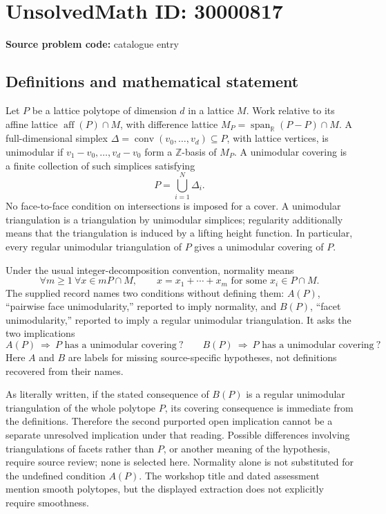 \documentclass[11pt]{article}
\newcommand{\Z}{\mathbb{Z}}
\newcommand{\R}{\mathbb{R}}
\begin{document}
\section*{UnsolvedMath ID: 30000817}
\textbf{Source problem code:} catalogue entry
\subsection{Definitions and mathematical statement}
Let \(P\) be a lattice polytope of dimension \(d\) in a lattice \(M\). Work relative to its affine lattice \(\operatorname{aff}(P)\cap M\), with difference lattice \(M_P=\operatorname{span}_{\R}(P-P)\cap M\). A full-dimensional simplex \(\Delta=\operatorname{conv}(v_0,\ldots,v_d)\subseteq P\), with lattice vertices, is unimodular if \(v_1-v_0,\ldots,v_d-v_0\) form a \(\Z\)-basis of \(M_P\). A unimodular covering is a finite collection of such simplices satisfying
\[
 P=\bigcup_{i=1}^N\Delta_i.
\]
No face-to-face condition on intersections is imposed for a cover. A unimodular triangulation is a triangulation by unimodular simplices; regularity additionally means that the triangulation is induced by a lifting height function. In particular, every regular unimodular triangulation of \(P\) gives a unimodular covering of \(P\).

Under the usual integer-decomposition convention, normality means
\[
 \forall m\geq1\ \forall x\in mP\cap M,\qquad
 x=x_1+\cdots+x_m\text{ for some }x_i\in P\cap M.
\]
The supplied record names two conditions without defining them: \(A(P)\), ``pairwise face unimodularity,'' reported to imply normality, and \(B(P)\), ``facet unimodularity,'' reported to imply a regular unimodular triangulation. It asks the two implications
\[
 A(P)\ \Longrightarrow\ P\text{ has a unimodular covering}\ ?
 \qquad
 B(P)\ \Longrightarrow\ P\text{ has a unimodular covering}\ ?
\]
Here \(A\) and \(B\) are labels for missing source-specific hypotheses, not definitions recovered from their names.

As literally written, if the stated consequence of \(B(P)\) is a regular unimodular triangulation of the whole polytope \(P\), its covering consequence is immediate from the definitions. Therefore the second purported open implication cannot be a separate unresolved implication under that reading. Possible differences involving triangulations of facets rather than \(P\), or another meaning of the hypothesis, require source review; none is selected here. Normality alone is not substituted for the undefined condition \(A(P)\). The workshop title and dated assessment mention smooth polytopes, but the displayed extraction does not explicitly require smoothness.
\end{document}
